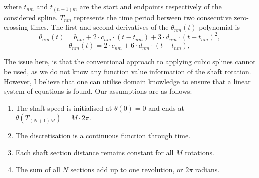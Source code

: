 \documentclass{article}
\begin{document}
	where $t_{nm}$ and $t_{(n + 1)m}$ are the start and endpoints respectively of the considered spline. $T_{nm}$ represents the time period between two consecutive zero-crossing times. The first and second derivatives of the $\theta_{nm}(t)$ polynomial is
	\begin{equation}
		\dot{\theta}_{nm}(t) = b_{nm} + 2 \cdot c_{nm} \cdot \left(t - t_{nm} \right) + 3 \cdot d_{nm} \cdot \left( t - t_{nm}\right)^2,
	\end{equation}
	\begin{equation}
		\ddot{\theta}_{nm}(t) = 2 \cdot c_{nm} + 6 \cdot d_{nm} \cdot \left( t - t_{nm}\right),
	\end{equation}
	
	The issue here, is that the conventional approach to applying cubic splines cannot be used, as we do not know any function value information of the shaft rotation. However, I believe that one can utilise domain knowledge to ensure that a linear system of equations is found. Our assumptions are as follows:
	\begin{enumerate}
		\item The shaft speed is initialised at $\theta(0) = 0$ and ends at $\theta(T_{(N + 1)M}) = M \cdot 2 \pi$.
		\item The discretisation is a continuous function through time.
		\item Each shaft section distance remains constant for all $M$ rotations.
		\item The sum of all $N$ sections add up to one revolution, or $2\pi$ radians.
	\end{enumerate}
\end{document}
